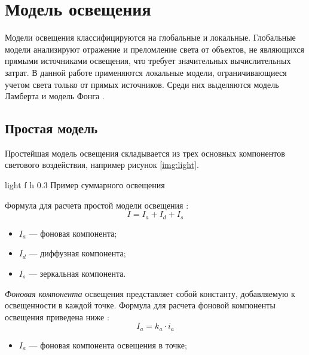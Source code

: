 \section{Модель освещения}

Модели освещения классифицируются на глобальные и локальные. Глобальные модели анализируют отражение и преломление света от объектов, не являющихся прямыми источниками освещения, что требует значительных вычислительных затрат. В данной работе применяются локальные модели, ограничивающиеся учетом света только от прямых источников. Среди них выделяются модель Ламберта и модель Фонга \cite{lightmodfv}.


\subsection{Простая модель}

Простейшая модель освещения складывается из трех основных компонентов светового воздействия, например рисунок \ref{img:light}.

{light} %
{f} %
{h} %
{0.3\textwidth} %
{Пример суммарного освещения} %



Формула для расчета простой модели освещения \cite{lightmodf}:
\begin{equation}
	I = I_{a} + I_{d} + I_{s}
\end{equation}

\begin{itemize}
	\item $I_{a}$ --- фоновая компонента;
	\item $I_{d}$ --- диффузная компонента;
	\item $I_{s}$ --- зеркальная компонента.
\end{itemize}

\textit{Фоновая компонента} освещения представляет собой константу, добавляемую к освещенности в каждой точке. Формула для расчета фоновой компоненты освещения приведена ниже \cite{lightmodf} : \begin{equation}
	I_{a}=k_{a} \cdot i_{a}
\end{equation}
\begin{itemize}
	\item $I_{a}$ --- фоновая компонента освещения в точке;
\end{itemize}

